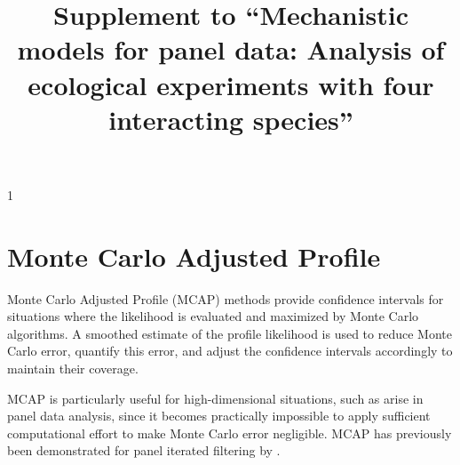 \documentclass[aoas,preprint]{imsart}\usepackage[]{graphicx}\usepackage[]{xcolor}
\newcommand{\blind}{1}
\begin{document}
\begin{frontmatter}
\title{Supplement to ``Mechanistic models for panel data: Analysis of ecological experiments with four interacting species''}

\blind
{
} \fi
\end{frontmatter}



\tableofcontents
\newpage
\section{Monte Carlo Adjusted Profile}

Monte Carlo Adjusted Profile (MCAP) methods \citep{ionides17,ning21} provide confidence intervals for situations where the likelihood is evaluated and maximized by Monte Carlo algorithms.
A smoothed estimate of the profile likelihood is used to reduce Monte Carlo error, quantify this error, and adjust the confidence intervals accordingly to maintain their coverage.

\parskip 3mm

MCAP is particularly useful for high-dimensional situations, such as arise in panel data analysis, since it becomes practically impossible to apply sufficient computational effort to make Monte Carlo error negligible.
MCAP has previously been demonstrated for panel iterated filtering by \citet{breto20}.

\parskip 3mm
\end{document}
